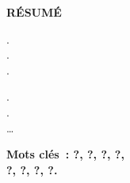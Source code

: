 \begin{center}

\hr

\textbf{RÉSUMÉ}

\end{center}

.\\
.\\
.

.\\
.\\
…

\textbf{Mots clés : ?, ?, ?, ?,\\
?, ?, ?, ?.}
